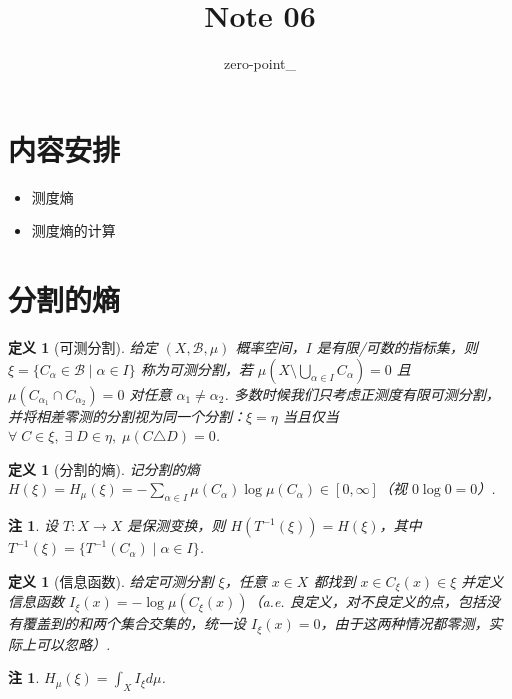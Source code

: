 \documentclass[11pt, a4paper, oneside]{ctexart}
\title{Note 06}
\author{zero-point\_}
\newtheorem{definition}[theorem]{定义}
\newtheorem{remark}[theorem]{注}
\newcommand{\cB}{\mathcal{B}}
\begin{document}
	\maketitle
    \section{内容安排}
    \begin{itemize}
        \item 测度熵
        \item 测度熵的计算
    \end{itemize}

    \section{分割的熵}
    \begin{definition}[可测分割]
        给定 $(X,\cB,\mu)$ 概率空间，$I$ 是有限/可数的指标集，则 $\xi=\{C_{\alpha}\in\cB\mid\alpha\in I\}$ 称为可测分割，若 $\mu(X\setminus\bigcup\limits_{\alpha\in I}C_{\alpha})=0$ 且 $\mu(C_{\alpha_1}\cap C_{\alpha_2})=0$ 对任意 $\alpha_1\neq \alpha_2$. 多数时候我们只考虑正测度有限可测分割，并将相差零测的分割视为同一个分割：$\xi=\eta$ 当且仅当 $\forall\; C\in \xi,\;\exists\; D\in\eta,\; \mu(C\triangle D)=0$.
    \end{definition}
    
    \begin{definition}[分割的熵]
        记分割的熵 $H(\xi)=H_{\mu}(\xi)=-\sum\limits_{\alpha\in I}\mu(C_{\alpha})\log\mu(C_{\alpha})\in [0,\infty]$（视 $0\log 0=0$）.
    \end{definition}
    \begin{remark}
        设 $T:X\to X$ 是保测变换，则 $H(T^{-1}(\xi))=H(\xi)$，其中 $T^{-1}(\xi)=\{T^{-1}(C_{\alpha})\mid \alpha\in I\}$.
    \end{remark}
    \begin{definition}[信息函数]
        给定可测分割 $\xi$，任意 $x\in X$ 都找到 $x\in C_{\xi}(x)\in \xi$ 并定义信息函数 $I_{\xi}(x)=-\log\mu(C_{\xi}(x))$（a.e. 良定义，对不良定义的点，包括没有覆盖到的和两个集合交集的，统一设 $I_{\xi}(x)=0$，由于这两种情况都零测，实际上可以忽略）.
    \end{definition}
    \begin{remark}
        $H_{\mu}(\xi)=\int_{X}I_{\xi}d\mu$.
    \end{remark}
\end{document}
